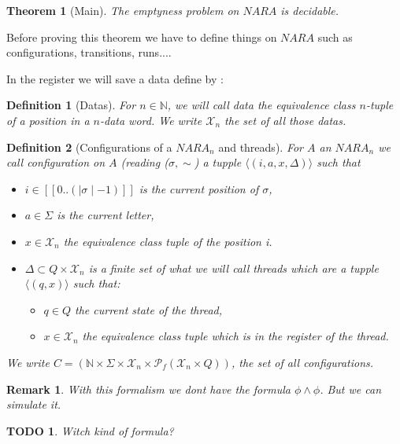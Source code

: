 \documentclass[a4paper,10pt]{report}
\newtheorem{thr}{Theorem} %
\newtheorem{df}{Definition}
\newtheorem{rk}{Remark}
\newtheorem{td}{TODO}
\newcommand{\seg}[1]{[\![#1]\!]}
\newcommand{\segw}[1]{\seg{0..(\mid #1\mid -1)}}
\newcommand{\X}{\mathcal{X}_{n}}
\begin{document}
\begin{thr}[Main]
  \label{main}
 The emptyness problem on $NARA$ is decidable.
\end{thr}


Before proving this theorem we have to define things on $NARA$ such as configurations, transitions, runs....


In the register we will save a data define by :  
\begin{df}[Datas]
  For $n\in \mathbb N$, we will call data the equivalence class $n$-tuple of a position in a $n$-data word.
  We write $\X$ the set of all those datas.
\end{df}

\begin{df}[Configurations of a $NARA_n$ and threads]
For $A$ an $NARA_n$ we call configuration on $A$ (reading ($\sigma,\sim$) a tupple  
 $\langle (i, a ,x, \Delta  )  \rangle$
 such that 
  \begin{itemize}
    \item $i \in \segw{\sigma }$ is the current position of $\sigma$,
    \item $a \in \Sigma$ is the current letter, 
    \item $x\in  \X$ the equivalence class tuple of the position i.
    \item $\Delta \subset Q \times \X$ is a finite set of what we will call threads which are a tupple  
    $\langle (q,x)  \rangle$ such that:
      \begin{itemize}
	\item $q \in Q$ the current state of the thread,
	\item $x\in  \X $ the equivalence class tuple which is in the register of the thread.
      \end{itemize}
   \end{itemize}
 We write $C = (\mathbb N \times \Sigma \times \X \times \mathcal{P}_f(\X \times Q))$, the set of all configurations.
\end{df}

\begin{rk}
  With this formalism we dont have the formula $ \phi \wedge \phi$. But we can simulate it.
\end{rk}
\begin{td}
  Witch kind of formula?
\end{td}
\end{document}
